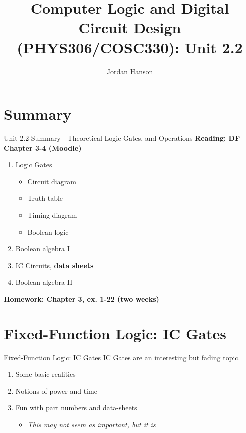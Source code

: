 \documentclass{beamer}
\title{Computer Logic and Digital Circuit Design (PHYS306/COSC330): Unit 2.2}
\author{Jordan Hanson}
\institute{Whittier College Department of Physics and Astronomy}
\begin{document}
\maketitle

\section{Summary}

\begin{frame}{Unit 2.2 Summary - Theoretical Logic Gates, and Operations}
\textbf{Reading: DF Chapter 3-4 (Moodle)}
\begin{enumerate}
\item Logic Gates
\begin{itemize}
\item Circuit diagram
\item Truth table
\item Timing diagram
\item Boolean logic
\end{itemize}
\item \alert{Boolean algebra I}
\item IC Circuits, \textbf{data sheets}
\item \alert{Boolean algebra II}
\end{enumerate}
\textbf{Homework: Chapter 3, ex. 1-22 (two weeks)}
\end{frame}

\section{Fixed-Function Logic: IC Gates}

\begin{frame}{Fixed-Function Logic: IC Gates}
IC Gates are an interesting but fading topic.
\begin{enumerate}
\item Some basic realities
\item Notions of power and time
\item \alert{Fun with part numbers and data-sheets}
\begin{itemize}
\item \textit{This may not seem as important, but it is}
\end{itemize}
\end{enumerate}
\end{frame}
\end{document}
